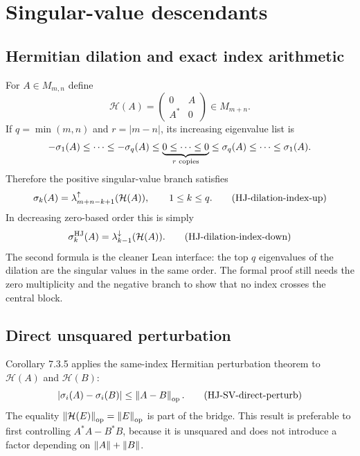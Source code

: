 \section{Singular-value descendants}


\subsection{Hermitian dilation and exact index arithmetic}

For $A\in M_{m,n}$ define
\[
  \mathcal H(A)=\begin{pmatrix}0&A\\A^*&0\end{pmatrix}\in M_{m+n}.
\]
If $q=\min(m,n)$ and $r=|m-n|$, its increasing eigenvalue list is
\[
 -\sigma_1(A)\le\cdots\le-\sigma_q(A)
 \le\underbrace{0\le\cdots\le0}_{r\text{ copies}}
 \le\sigma_q(A)\le\cdots\le\sigma_1(A).
\]
Therefore the positive singular-value branch satisfies
\begin{equation}
  \sigma_k(A)=\lambda_{m+n-k+1}^{\uparrow}(\mathcal H(A)),
  \qquad 1\le k\le q. \tag{HJ-dilation-index-up}
\end{equation}
In decreasing zero-based order this is simply
\begin{equation}
  \sigma_k^{\mathrm{HJ}}(A)=\lambda_{k-1}^{\downarrow}(\mathcal H(A)). \tag{HJ-dilation-index-down}
\end{equation}
The second formula is the cleaner Lean interface: the top $q$ eigenvalues of the dilation are the singular values in the same order. The formal proof still needs the zero multiplicity and the negative branch to show that no index crosses the central block.

\subsection{Direct unsquared perturbation}

Corollary 7.3.5 applies the same-index Hermitian perturbation theorem to
$\mathcal H(A)$ and $\mathcal H(B)$:
\begin{equation}
  |\sigma_i(A)-\sigma_i(B)|\le\left\lVert A-B\right\rVert_{\mathrm{op}}. \tag{HJ-SV-direct-perturb}
\end{equation}
The equality $\left\lVert \mathcal H(E)\right\rVert_{\mathrm{op}}=\left\lVert E\right\rVert_{\mathrm{op}}$ is part of the bridge. This result is preferable to first controlling $A^*A-B^*B$, because it is unsquared and does not introduce a factor depending on $\left\lVert A\right\rVert+\left\lVert B\right\rVert$.

